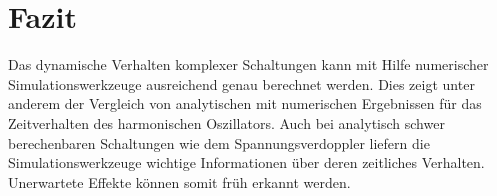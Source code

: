 \section*{Fazit}\label{sec:fazit}
Das dynamische Verhalten komplexer Schaltungen kann mit Hilfe numerischer Simulationswerkzeuge ausreichend genau berechnet werden. Dies zeigt unter anderem der Vergleich von analytischen mit numerischen Ergebnissen für das Zeitverhalten des harmonischen Oszillators. Auch bei analytisch schwer berechenbaren Schaltungen wie dem Spannungsverdoppler liefern die Simulationswerkzeuge wichtige Informationen über deren zeitliches Verhalten. Unerwartete Effekte können somit früh erkannt werden.